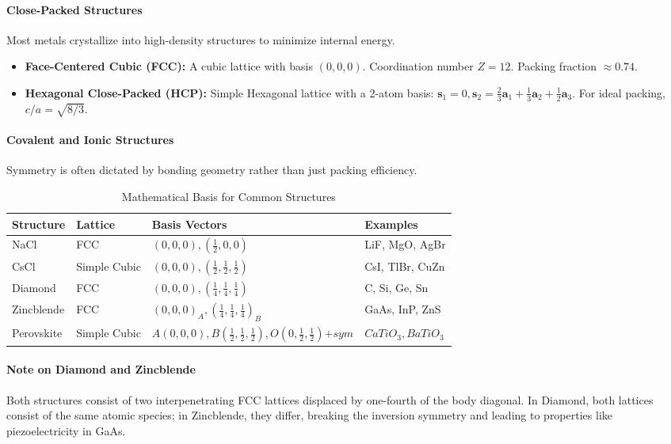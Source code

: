 \documentclass[10pt, a4paper]{article}
\begin{document}
\paragraph{Close-Packed Structures}
Most metals crystallize into high-density structures to minimize internal energy.
\begin{itemize}
    \item \textbf{Face-Centered Cubic (FCC):} A cubic lattice with basis $(0,0,0)$. Coordination number $Z=12$. Packing fraction $\approx 0.74$.
    \item \textbf{Hexagonal Close-Packed (HCP):} Simple Hexagonal lattice with a 2-atom basis: $\mathbf{s}_1 = 0, \mathbf{s}_2 = \frac{2}{3}\mathbf{a}_1 + \frac{1}{3}\mathbf{a}_2 + \frac{1}{2}\mathbf{a}_3$. For ideal packing, $c/a = \sqrt{8/3}$.
\end{itemize}

\paragraph{Covalent and Ionic Structures}
Symmetry is often dictated by bonding geometry rather than just packing efficiency.

\begin{table}[H]
\centering
\caption{Mathematical Basis for Common Structures}
\begin{tabular}{@{}llll@{}}
\toprule
\textbf{Structure} & \textbf{Lattice} & \textbf{Basis Vectors} & \textbf{Examples} \\ \midrule
NaCl & FCC & $(0,0,0), (\frac{1}{2},0,0)$ & LiF, MgO, AgBr \\
CsCl & Simple Cubic & $(0,0,0), (\frac{1}{2},\frac{1}{2},\frac{1}{2})$ & CsI, TlBr, CuZn \\
Diamond & FCC & $(0,0,0), (\frac{1}{4},\frac{1}{4},\frac{1}{4})$ & C, Si, Ge, Sn \\
Zincblende & FCC & $(0,0,0)_A, (\frac{1}{4},\frac{1}{4},\frac{1}{4})_B$ & GaAs, InP, ZnS \\
Perovskite & Simple Cubic & $A(0,0,0), B(\frac{1}{2},\frac{1}{2},\frac{1}{2}), O(0,\frac{1}{2},\frac{1}{2})\text{+}sym$ & $CaTiO_3, BaTiO_3$ \\ \bottomrule
\end{tabular}
\end{table}

\paragraph{Note on Diamond and Zincblende}
Both structures consist of two interpenetrating FCC lattices displaced by one-fourth of the body diagonal. In Diamond, both lattices consist of the same atomic species; in Zincblende, they differ, breaking the inversion symmetry and leading to properties like piezoelectricity in GaAs.
\end{document}
